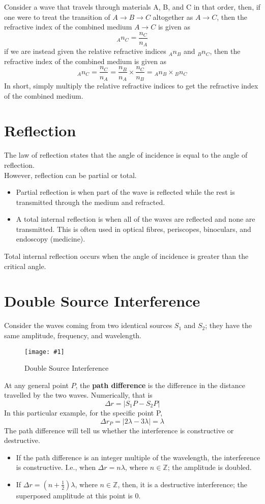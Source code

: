 \documentclass[a4paper,12pt]{article}
\let\oldsection\section
\renewcommand\section{\clearpage\oldsection}
\newcommand{\lb}{\\[8pt]}
\newcommand{\img}[4]{\begin{center}
  \begin{figure}[H]
    \centering
    \texttt{[image: \#1]}
    \caption{#3}
    \label{fig:#4}
  \end{figure}
\end{center}}
\begin{document}
Consider a wave that travels through materials A, B, and C in that order, then, if one were to treat the transition of $A\to B \to C$ altogether as $A\to C$, then the refractive index of the combined medium $A\to C$ is given as $$_An_C = \frac{n_C}{n_A}$$
if we are instead given the relative refractive indices $_An_B$ and $_Bn_C$, then the refractive index of the combined medium is given as $$_An_C = \frac{n_C}{n_A} = \frac{n_B}{n_A}\times \frac{n_C}{n_B}  = \phantom{}_An_B \times \phantom{}_Bn_C$$
In short, simply multiply the relative refractive indices to get the refractive index of the combined medium.

\section{Reflection}
The law of reflection states that the angle of incidence is equal to the angle of reflection.\lb
However, reflection can be partial or total.
\begin{itemize}
  \item Partial reflection is when part of the wave is reflected while the rest is transmitted through the medium and refracted.
  \item A total internal reflection is when all of the waves are reflected and none are transmitted. This is often used in optical fibres, periscopes, binoculars, and endoscopy (medicine).
\end{itemize}

Total internal reflection occurs when the angle of incidence is greater than the critical angle.

\section{Double Source Interference}

Consider the waves coming from two identical sources $S_1$ and $S_2$; they have the same amplitude, frequency, and wavelength.

\img{doublesource.png}{0.4}{Double Source Interference}{doublesource}

At any general point $P$, the \textbf{path difference} is the difference in the distance travelled by the two waves. Numerically, that is $$\Delta r = \lvert S_1P - S_2P \rvert$$
In this particular example, for the specific point P, $$\Delta r_P = |2\lambda - 3\lambda| = \lambda$$
The path difference will tell us whether the interference is constructive or destructive.
\begin{itemize}
  \item If the path difference is an integer multiple of the wavelength, the interference is constructive. I.e., when $\Delta r = n\lambda$, where $n \in \mathbb{Z}$; the amplitude is doubled.
  \item If $\Delta r = (n + \frac{1}{2})\lambda$, where $n \in \mathbb{Z}$, then, it is a destructive interference; the superposed amplitude at this point is 0.
\end{itemize}
\end{document}
